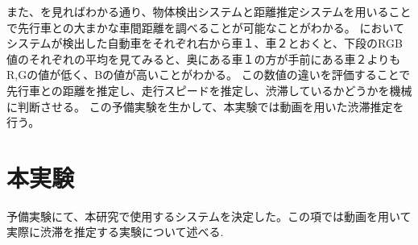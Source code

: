 また、を見ればわかる通り、物体検出システムと距離推定システムを用いることで先行車との大まかな車間距離を調べることが可能なことがわかる。
においてシステムが検出した自動車をそれぞれ右から車１、車２とおくと、下段のRGB値のそれぞれの平均を見てみると、奥にある車１の方が手前にある車２よりもR,Gの値が低く、Bの値が高いことがわかる。
この数値の違いを評価することで先行車との距離を推定し、走行スピードを推定し、渋滞しているかどうかを機械に判断させる。
この予備実験を生かして、本実験では動画を用いた渋滞推定を行う。

\section{本実験}
予備実験にて、本研究で使用するシステムを決定した。この項では動画を用いて実際に渋滞を推定する実験について述べる.
